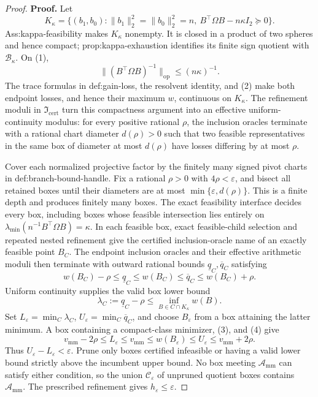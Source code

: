 \documentclass{article}
\begin{document}
\begin{proof}
\textbf{Proof.}
Let
\[
K_\kappa=\{(b_1,b_0):\lVert b_1\rVert_2^2=\lVert b_0\rVert_2^2=n,
\ B^{\top}\Omega B-n\kappa I_2\succeq0\}.
\tag{1}
\]
Ass:kappa-feasibility makes \(K_\kappa\) nonempty.  It is closed in a product of two spheres and hence compact; prop:kappa-exhaustion identifies its finite sign quotient with \(\mathcal B_\kappa\).  On (1),
\[
\lVert(B^{\top}\Omega B)^{-1}\rVert_{\mathrm{op}}\le(n\kappa)^{-1}.
\tag{2}
\]
The trace formulas in def:gain-loss, the resolvent identity, and (2) make both endpoint losses, and hence their maximum \(w\), continuous on \(K_\kappa\).  The refinement moduli in \(\mathfrak I_{\mathrm{cert}}\) turn this compactness argument into an effective uniform-continuity modulus: for every positive rational \(\rho\), the inclusion oracles terminate with a rational chart diameter \(d(\rho)>0\) such that two feasible representatives in the same box of diameter at most \(d(\rho)\) have losses differing by at most \(\rho\).

Cover each normalized projective factor by the finitely many signed pivot charts in def:branch-bound-handle.  Fix a rational \(\rho>0\) with \(4\rho<\varepsilon\), and bisect all retained boxes until their diameters are at most \(\min\{\varepsilon,d(\rho)\}\).  This is a finite depth and produces finitely many boxes.  The exact feasibility interface decides every box, including boxes whose feasible intersection lies entirely on
\(\lambda_{\min}(n^{-1}B^{\top}\Omega B)=\kappa\).  In each feasible box, exact feasible-child selection and repeated nested refinement give the certified inclusion-oracle name of an exactly feasible point \(B_C\).  The endpoint inclusion oracles and their effective arithmetic moduli then terminate with outward rational bounds \(\underline q_C,\overline q_C\) satisfying
\[
w(B_C)-\rho\le\underline q_C\le w(B_C)
\le\overline q_C\le w(B_C)+\rho.
\tag{3}
\]
Uniform continuity supplies the valid box lower bound
\[
\lambda_C:=\underline q_C-\rho
\le\inf_{B\in C\cap K_\kappa}w(B).
\tag{4}
\]
Set \(L_\varepsilon=\min_C\lambda_C\), \(U_\varepsilon=\min_C\overline q_C\), and choose \(B_\varepsilon\) from a box attaining the latter minimum.  A box containing a compact-class minimizer, (3), and (4) give
\[
v_{\mathrm{mm}}-2\rho\le L_\varepsilon\le v_{\mathrm{mm}}
\le w(B_\varepsilon)\le U_\varepsilon\le v_{\mathrm{mm}}+2\rho.
\tag{5}
\]
Thus \(U_\varepsilon-L_\varepsilon<\varepsilon\).  Prune only boxes certified infeasible or having a valid lower bound strictly above the incumbent upper bound.  No box meeting \(\mathcal A_{\mathrm{mm}}\) can satisfy either condition, so the union \(\mathcal C_\varepsilon\) of unpruned quotient boxes contains \(\mathcal A_{\mathrm{mm}}\).  The prescribed refinement gives \(h_\varepsilon\le\varepsilon\).


\end{proof}
\end{document}
